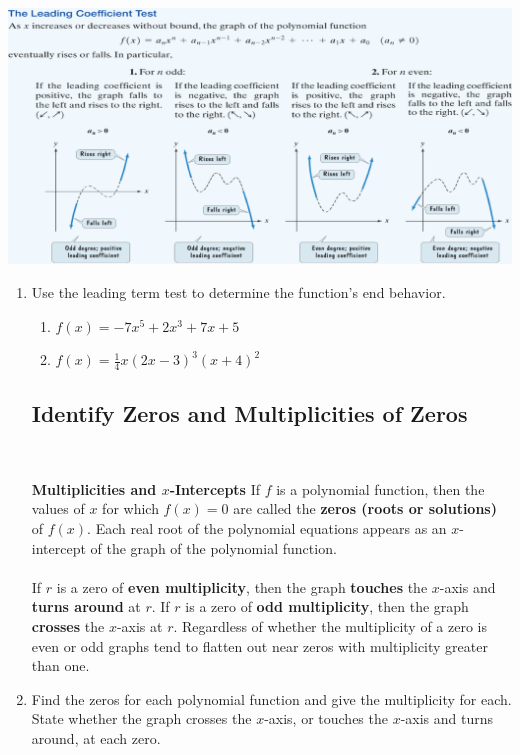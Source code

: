 \includegraphics[scale=.95]{poly1}
\begin{enumerate}

\item Use the leading term test to determine the function's end behavior.


\begin{enumerate}
\item $f(x)=-7x^5+2x^3+7x+5$
\vfill

\item $f(x)=\frac{1}{4}x(2x-3)^3(x+4)^2$
\vfill
\vfill
\end{enumerate}

\subsection{Identify Zeros and Multiplicities of Zeros} ~

\begin{boxthm}
{\bf Multiplicities and $x$-Intercepts}
If $f$ is a polynomial function, then the values of $x$ for which $f(x)=0$ are called the \textbf{zeros (roots or solutions)} of $f(x)$.  Each real root of the polynomial equations appears as an $x$-intercept of the graph of the polynomial function.\\
\\
If $r$ is a zero of \textbf{even multiplicity}, then the graph \textbf{touches} the $x$-axis and \textbf{turns around} at $r$.  If $r$ is a zero of \textbf{odd multiplicity}, then the graph \textbf{crosses} the $x$-axis at $r$.  Regardless of whether the multiplicity of a zero is even or odd graphs tend to flatten out near zeros with multiplicity greater than one.
\end{boxthm}
\newpage



\item Find the zeros for each polynomial function and give the multiplicity for each.  State whether the graph crosses the $x$-axis, or touches the $x$-axis and turns around, at each zero.


\end{enumerate}
